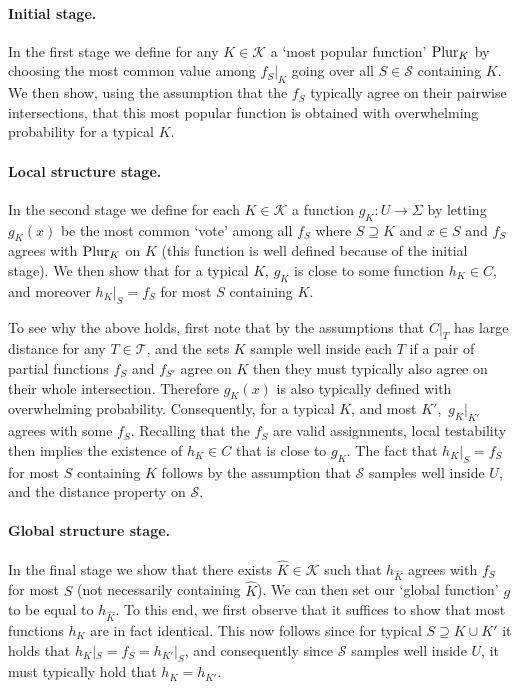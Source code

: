 \documentclass[11pt]{article}
\numberwithin{equation}{section}
\theoremstyle{definition}
\theoremstyle{plain}
\theoremstyle{plain}
\newcommand{\calT}{{\mathcal{T}}}
\newcommand{\calS}{{\mathcal{S}}}
\newcommand{\calK}{{\mathcal{K}}}
\newcommand{\pl}{{\rm{Plur}}}
\begin{document}
\paragraph{Initial stage.} In the first stage we define for any $K \in \calK$ a `most popular function' %
$\pl_K$ by choosing the most common value among $f_S|_K$ going over all $S \in \calS$ containing $K$. We then show, using the assumption
that %
the $f_S$  %
typically agree on their
pairwise  %
intersections, that this most popular function is obtained with 
overwhelming probability for a typical $K$.
%
%

\paragraph{Local structure stage.} In the second stage we define for each $K \in \calK$ a function $g_K: U \to \Sigma$ by letting $g_K(x)$ be the most common `vote' among all $f_S$
%
where $S\supseteq K$ and $x\in S$  %
and %
$f_S$ agrees  %
with $\pl_K$  on $K$ (this function is well defined because of the initial stage). We then show that for a typical $K$, $g_K$ is close to some function $h_K \in C$, and moreover $h_K|_S = f_S$ for most $S$ containing $K$.

To see why the above holds, first note that by the assumptions 
that $C|_T$ has large distance %
for any $T \in \calT$, 
 and the sets $K$  %
sample well inside %
each $T$  %
%
if a pair of %
partial functions $f_S$ and $f_{S'}$  %
agree on $K$ then they must typically also agree on their whole intersection. Therefore $g_K(x)$ is also typically defined with overwhelming probability. Consequently, for a typical $K$, and most $K'$,\ $g_K|_{K'}$ agrees with some $f_S$. Recalling that
%
the $f_S$ are  %
valid assignments, local testability then implies the existence of $h_K \in C$ that is close to $g_K$. The fact that $h_K|_S = f_S$ for most $S$ containing
$K$ follows by the assumption that $\calS$ samples well
inside  %
$U$, and the distance property on $\calS$. 

\paragraph{Global structure stage.} In the final stage we show that there 
exists %
${\hat K}\in \calK$  %
such that $h_{\hat K}$ agrees with $f_S$ for most $S$ (not necessarily 
containing $\hat K$). We can then set our
`global function' %
$g$ to be equal to $h_{\hat K}$.
To this end, we first observe that it suffices to show that most functions
$h_K$ are in fact identical.
This now follows since for typical $S \supseteq K\cup K'$ it holds that 
$h_K|_S = f_S = h_{K'}|_S$, and consequently since $\calS$
samples %
well inside $U$,  %
it must typically hold that $h_K=h_{K'}$.
%
%
\end{document}
